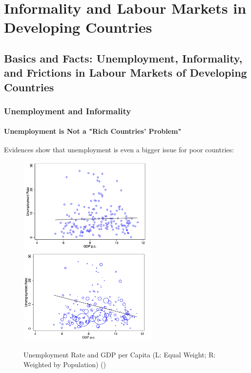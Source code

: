 \chapter{Informality and Labour Markets in Developing Countries}


\section{Basics and Facts: Unemployment, Informality, and Frictions in Labour Markets of Developing Countries}

    \subsection{Unemployment and Informality}
    
        \subsubsection{Unemployment is Not a "Rich Countries' Problem"}
            Evidences show that unemployment is even a bigger issue for poor countries:
            \begin{figure}[H]
                \centering
                \includegraphics[width=2.75in]{images/ch6/unemp_gdp_1.png}
                \includegraphics[width=2.75in]{images/ch6/unemp_gdp_2.png}
                \caption{Unemployment Rate and GDP per Capita (L: Equal Weight; R: Weighted by Population) (\cite{the_world_bank_world_2022})}
            \end{figure}
            
